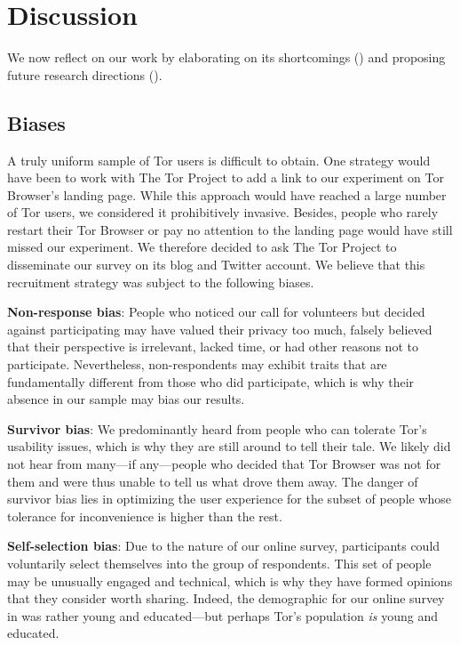 \section{Discussion}
\label{sec:discussion}

We now reflect on our work by elaborating on its shortcomings
() and proposing future research directions
().

\subsection{Biases}
\label{sec:biases}

A truly uniform sample of Tor users is difficult to obtain.  One strategy would
have been to work with The Tor Project to add a link to our experiment on Tor
Browser's landing page.  While this approach would have reached a large number
of Tor users, we considered it prohibitively invasive.  Besides, people who
rarely restart their Tor Browser or pay no attention to the landing page would
have still missed our experiment.  We therefore decided to ask The Tor Project
to disseminate our survey on its blog and Twitter account.  We believe that this
recruitment strategy was subject to the following biases.

\textbf{Non-response bias}:
People who noticed our call for volunteers but decided against participating may
have valued their privacy too much, falsely believed that their perspective is
irrelevant, lacked time, or had other reasons not to participate.  Nevertheless,
non-respondents may exhibit traits that are fundamentally different from those
who did participate, which is why their absence in our sample may bias our
results.

\textbf{Survivor bias}:
We predominantly heard from people who can tolerate Tor's usability issues,
which is why they are still around to tell their tale.  We likely did not hear
from many---if any---people who decided that Tor Browser was not for them and
were thus unable to tell us what drove them away.  The danger of survivor bias
lies in optimizing the user experience for the subset of people whose tolerance
for inconvenience is higher than the rest.

\textbf{Self-selection bias}:
Due to the nature of our online survey, participants could voluntarily select
themselves into the group of respondents.  This set of people may be unusually
engaged and technical, which is why they have formed opinions that they
consider worth sharing.  Indeed, the demographic for our online survey in
 was rather young and educated---but perhaps Tor's
population \emph{is} young and educated.

